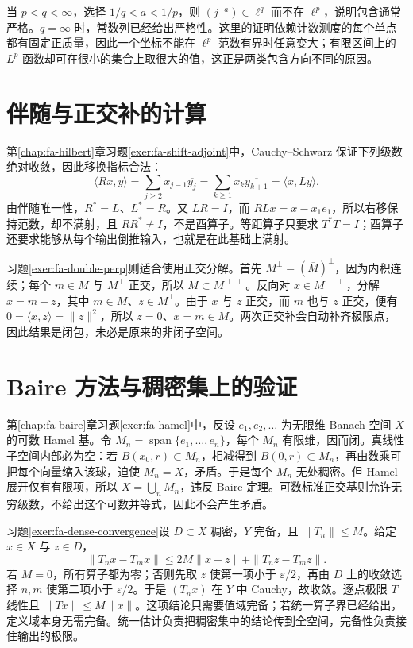\documentclass[UTF8,12pt,a4paper,fontset=fandol]{ctexbook}
\begin{document}
当 $p<q<\infty$，选择 $1/q<a<1/p$，则 $(j^{-a})\in\ell^q$ 而不在 $\ell^p$，说明包含通常严格。$q=\infty$ 时，常数列已经给出严格性。这里的证明依赖计数测度的每个单点都有固定正质量，因此一个坐标不能在 $\ell^p$ 范数有界时任意变大；有限区间上的 $L^p$ 函数却可在很小的集合上取很大的值，这正是两类包含方向不同的原因。

\section{伴随与正交补的计算}
第\ref{chap:fa-hilbert}章习题\ref{exer:fa-shift-adjoint}中，Cauchy--Schwarz 保证下列级数绝对收敛，因此移换指标合法：
\[
 \langle Rx,y\rangle=\sum_{j\geq2}x_{j-1}\overline{y_j}
 =\sum_{k\geq1}x_k\overline{y_{k+1}}=\langle x,Ly\rangle.
\]
由伴随唯一性，$R^*=L$、$L^*=R$。又 $LR=I$，而 $RLx=x-x_1e_1$，所以右移保持范数，却不满射，且 $RR^*\ne I$，不是酉算子。等距算子只要求 $T^*T=I$；酉算子还要求能够从每个输出倒推输入，也就是在此基础上满射。

习题\ref{exer:fa-double-perp}则适合使用正交分解。首先 $M^\perp=(\overline M)^\perp$，因为内积连续；每个 $m\in\overline M$ 与 $M^\perp$ 正交，所以 $\overline M\subset M^{\perp\perp}$。反向对 $x\in M^{\perp\perp}$，分解 $x=m+z$，其中 $m\in\overline M$、$z\in M^\perp$。由于 $x$ 与 $z$ 正交，而 $m$ 也与 $z$ 正交，便有 $0=\langle x,z\rangle=\|z\|^2$，所以 $z=0$、$x=m\in\overline M$。两次正交补会自动补齐极限点，因此结果是闭包，未必是原来的非闭子空间。

\section{Baire 方法与稠密集上的验证}
第\ref{chap:fa-baire}章习题\ref{exer:fa-hamel}中，反设 $e_1,e_2,\ldots$ 为无限维 Banach 空间 $X$ 的可数 Hamel 基。令 $M_n=\operatorname{span}\{e_1,\ldots,e_n\}$，每个 $M_n$ 有限维，因而闭。真线性子空间内部必为空：若 $B(x_0,r)\subset M_n$，相减得到 $B(0,r)\subset M_n$，再由数乘可把每个向量缩入该球，迫使 $M_n=X$，矛盾。于是每个 $M_n$ 无处稠密。但 Hamel 展开仅有有限项，所以 $X=\bigcup_nM_n$，违反 Baire 定理。可数标准正交基则允许无穷级数，不给出这个可数并等式，因此不会产生矛盾。

习题\ref{exer:fa-dense-convergence}设 $D\subset X$ 稠密，$Y$ 完备，且 $\|T_n\|\leq M$。给定 $x\in X$ 与 $z\in D$，
\[
 \|T_nx-T_mx\|\leq2M\|x-z\|+\|T_nz-T_mz\|.
\]
若 $M=0$，所有算子都为零；否则先取 $z$ 使第一项小于 $\varepsilon/2$，再由 $D$ 上的收敛选择 $n,m$ 使第二项小于 $\varepsilon/2$。于是 $(T_nx)$ 在 $Y$ 中 Cauchy，故收敛。逐点极限 $T$ 线性且 $\|Tx\|\leq M\|x\|$。这项结论只需要值域完备；若统一算子界已经给出，定义域本身无需完备。统一估计负责把稠密集中的结论传到全空间，完备性负责接住输出的极限。
\end{document}

